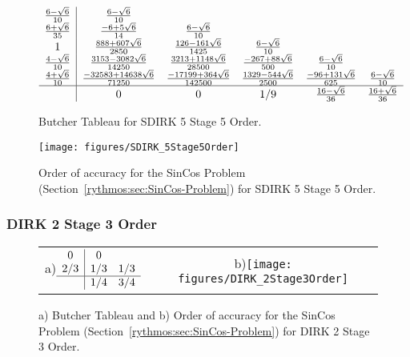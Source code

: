 \begin{figure}[H]
\centering{}$\begin{array}{c|ccccc}
\frac{6-\sqrt{6}}{10} & \frac{6-\sqrt{6}}{10}\\
\frac{6+\sqrt{6}}{35} & \frac{-6+5\sqrt{6}}{14} & \frac{6-\sqrt{6}}{10}\\
1 & \frac{888+607\sqrt{6}}{2850} & \frac{126-161\sqrt{6}}{1425} & \frac{6-\sqrt{6}}{10}\\
\frac{4-\sqrt{6}}{10} & \frac{3153-3082\sqrt{6}}{14250} & \frac{3213+1148\sqrt{6}}{28500} & \frac{-267+88\sqrt{6}}{500} & \frac{6-\sqrt{6}}{10}\\
\frac{4+\sqrt{6}}{10} & \frac{-32583+14638\sqrt{6}}{71250} & \frac{-17199+364\sqrt{6}}{142500} & \frac{1329-544\sqrt{6}}{2500} & \frac{-96+131\sqrt{6}}{625} & \frac{6-\sqrt{6}}{10}\\
\hline  & 0 & 0 & 1/9 & \frac{16-\sqrt{6}}{36} & \frac{16+\sqrt{6}}{36}
\end{array}$\caption{Butcher Tableau for SDIRK 5 Stage 5 Order.}
\end{figure}
\begin{figure}[H]
\centering{}\texttt{[image: figures/SDIRK\_5Stage5Order]}\caption{Order of accuracy for the SinCos Problem (Section~\ref{rythmos:sec:SinCos-Problem})
for SDIRK 5 Stage 5 Order.}
\end{figure}


\subsubsection{DIRK 2 Stage 3 Order}

\begin{figure}[H]
\centering{}%
\begin{tabular}{cc}
a)$\begin{array}{c|cc}
0 & 0\\
2/3 & 1/3 & 1/3\\
\hline  & 1/4 & 3/4
\end{array}$ & b)\texttt{[image: figures/DIRK\_2Stage3Order]}\tabularnewline
\end{tabular}\caption{a) Butcher Tableau and b) Order of accuracy for the SinCos Problem
(Section~\ref{rythmos:sec:SinCos-Problem}) for DIRK 2 Stage 3 Order.}
\end{figure}

